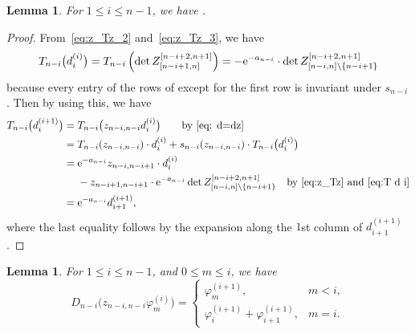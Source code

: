 \documentclass[pdftex]{sigma}
\numberwithin{equation}{section}
\newtheorem{Lemma}[Theorem]{Lemma}
\theoremstyle{definition}
\begin{document}
\begin{Lemma}\label{lem:T_on_f}
For $1\le i\le n-1$, we have .
\end{Lemma}
\begin{proof}
From~\eqref{eq:z_Tz_2} and~\eqref{eq:z_Tz_3}, we have
\begin{equation}
\label{eq:T d i}
T_{n-i}\bigl(d^{(i)}_{i}\bigr)
=
T_{n-i}\left(\det Z_{[n-i+1,n]}^{[n-i+2,n+1]}\right)=-{\rm e}^{-a_{n-i}}\cdot \det Z_{[n-i,n]\setminus \{n-i+1\}}^{[n-i+2,n+1]}
\end{equation}
because every entry of the rows of  except for the first row is invariant under $s_{n-i}$.
Then by using this, we have
\begin{align*}
T_{n-i}\bigl(d^{(i+1)}_{i}\bigr)={}&T_{n-i}\bigl(z_{n-i,n-i}d^{(i)}_{i}\bigr)\qquad\text{by~\eqref{eq: d=dz}}\\
={}&T_{n-i}(z_{n-i,n-i})\cdot d^{(i)}_{i}
+s_{n-i}(z_{n-i,n-i})\cdot T_{n-i}\bigl(d^{(i)}_{i}\bigr) \\
={}&
{\rm e}^{-a_{n-i}}z_{n-i,n-i+1}\cdot
d^{(i)}_i
\\
&-z_{n-i+1,n-i+1}\cdot {\rm e}^{-a_{n-i}}
\det Z_{[n-i,n]\setminus \{n-i+1\}}^{[n-i+2,n+1]}\quad\text{by~\eqref{eq:z_Tz} and~\eqref{eq:T d i}}\\
={}&{\rm e}^{-a_{n-i}}d^{(i+1)}_{i+1},
\end{align*}
where the last equality follows by the expansion along the $1$st column of $d^{(i+1)}_{i+1}$.
\end{proof}
\begin{Lemma}\label{lem: D z varphi}
For $1\le i\le n-1$,
and $0\le m\le i$, we have
\[
D_{n-i}\bigl(z_{n-i,n-i}\varphi^{(i)}_m\bigr)=
\begin{cases}
\varphi^{(i+1)}_{m}, & m<i,\\
\varphi^{(i+1)}_{i}+\varphi^{(i+1)}_{i+1}, & m=i.
\end{cases}
\]
\end{Lemma}
\end{document}
